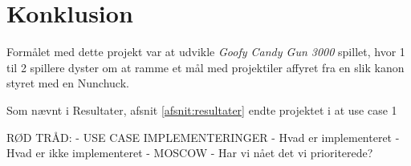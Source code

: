 \chapter{Konklusion}
Formålet med dette projekt var at udvikle \textit{Goofy Candy Gun 3000} spillet, hvor 1 til 2 spillere dyster om at ramme et mål med projektiler affyret fra en slik kanon styret med en Nunchuck. \newline

\noindent Som nævnt i Resultater, afsnit \ref{afsnit:resultater} endte projektet i at use case 1 

RØD TRÅD:
 - USE CASE IMPLEMENTERINGER
	 - Hvad er implementeret
	 - Hvad er ikke implementeret
 - MOSCOW 
	 - Har vi nået det vi prioriterede?